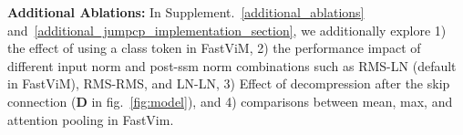 \begin{table}[ht]
    \caption{Effect of pooling in ViT on ImageNet-1k.} 
    \vspace{-15pt}
    \begin{center}
\end{center}
\vspace{-14pt}
    \label{tab:ablation_vit}
\end{table}


\noindent \textbf{Additional Ablations:} In Supplement.~\ref{additional_ablations} and~\ref{additional_jumpcp_implementation_section}, we additionally explore 1) the effect of using a class token in FastViM, 2) the performance impact of different input norm and post-ssm norm combinations such as RMS-LN (default in FastViM), RMS-RMS, and LN-LN, 3) Effect of decompression after the skip connection ($\mathbf{D}$ in fig.~\ref{fig:model}), and 4) comparisons between mean, max, and attention pooling in FastVim.


